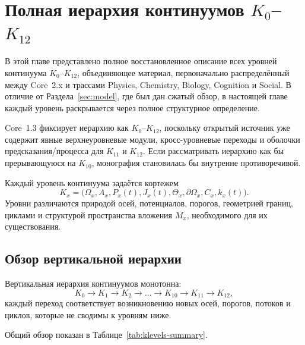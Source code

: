 
\section{Полная иерархия континуумов \texorpdfstring{\texorpdfstring{$K_0$}{K\_0}–$K_{12}$}{K0–K12}}
\label{sec:klevels-full}

В этой главе представлено полное восстановленное описание всех уровней
континуума \(K_0\)–\(K_{12}\), объединяющее материал, первоначально
распределённый между Core~2.x и трассами Physics, Chemistry, Biology, Cognition
и Social.
В отличие от Раздела~\ref{sec:model}, где был дан сжатый обзор,
в настоящей главе каждый уровень раскрывается через полное структурное
определение.

Core~1.3 фиксирует иерархию как \(K_0\)–\(K_{12}\), поскольку открытый
источник уже содержит явные верхнеуровневые модули, кросс-уровневые переходы
и оболочки предсказания/процесса для \(K_{11}\) и \(K_{12}\).
Если рассматривать иерархию как бы прерывающуюся на \(K_{10}\),
монография становилась бы внутренне противоречивой.

Каждый уровень континуума задаётся кортежем
\[
    K_x = \big(\Omega_x, A_x, P_x(t), J_x(t), \Theta_x,
           \partial\Omega_x, C_x, k_x(t)\big).
\]
Уровни различаются природой осей, потенциалов, порогов,
геометрией границ, циклами и структурой пространства вложения
\(M_x\), необходимого для их существования.


\subsection{Обзор вертикальной иерархии}

Вертикальная иерархия континуумов монотонна:
\[
    K_0 \rightarrow K_1 \rightarrow K_2 \rightarrow \dots
    \rightarrow K_{10} \rightarrow K_{11} \rightarrow K_{12},
\]
каждый переход соответствует возникновению новых осей,
порогов, потоков и циклов, которые не сводимы к уровням ниже.

Общий обзор показан в Таблице~\ref{tab:klevels-summary}.

